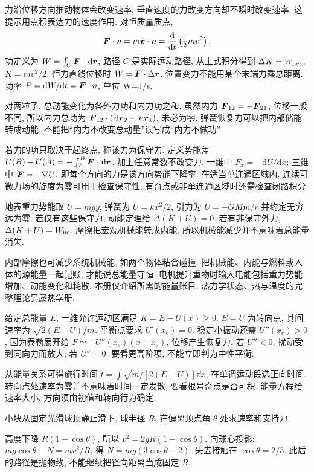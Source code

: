 \label{ch:energy}
力沿位移方向推动物体会改变速率, 垂直速度的力改变方向却不瞬时改变速率. 这提示用点积表达力的速度作用. 对恒质量质点,
\begin{equation}
\boldsymbol{F}\cdot\boldsymbol{v}=m\dot{\boldsymbol{v}}\cdot\boldsymbol{v}
=\frac{\mathrm d}{\mathrm dt}\left(\tfrac12mv^2\right).
\end{equation}
功定义为 $W=\int_C\boldsymbol{F}\cdot\,\mathrm d\boldsymbol{r}$, 路径 $C$ 是实际运动路径, 从上式积分得到 $\Delta K=W_{\rm net}$, $K=mv^2/2$. 恒力直线位移时 $W=\boldsymbol{F}\cdot\Delta\boldsymbol{r}$. 位置变力不能用某个末端力乘总距离. 功率 $P=\mathrm dW/\mathrm dt=\boldsymbol{F}\cdot\boldsymbol{v}$, 单位 W=J/s.

对两粒子, 总动能变化为各外力功和内力功之和. 虽然内力 $\boldsymbol{F}_{12}=-\boldsymbol{F}_{21}$, 位移一般不同, 所以内力总功为 $\boldsymbol{F}_{12}\cdot(\,\mathrm d\boldsymbol{r}_2-\,\mathrm d\boldsymbol{r}_1)$, 未必为零. 弹簧恢复力可以把内部储能转成动能. 不能把“内力不改变总动量”误写成“内力不做功”.

若力的功只取决于起终点, 称该力为保守力. 定义势能差 $U(B)-U(A)=-\int_A^B\boldsymbol{F}\cdot\,\mathrm d\boldsymbol{r}$. 加上任意常数不改变力. 一维中 $F_x=-\mathrm dU/\mathrm dx$; 三维中 $\boldsymbol{F}=-\nabla U$, 即每个方向的力是该方向势能下降率. 在适当单连通区域内, 连续可微力场的旋度为零可用于检查保守性; 有奇点或非单连通区域时还需检查闭路积分.

地表重力势能取 $U=mgy$, 弹簧为 $U=kx^2/2$, 引力为 $U=-GMm/r$ 并约定无穷远为零. 若仅有这些保守力, 动能定理给 $\Delta(K+U)=0$. 若有非保守外力, $\Delta(K+U)=W_{\rm nc}$. 摩擦把宏观机械能转成内能, 所以机械能减少并不意味着总能量消失.

内部摩擦也可减少系统机械能, 如两个物体粘合碰撞. 把机械能、内能与燃料或人体的源能量一起记账, 才能说总能量守恒. 电机提升重物时输入电能包括重力势能增加、动能变化和耗散. 本册仅介绍所需的能量账目, 热力学状态、热与温度的完整理论另属热学册.

给定总能量 $E$, 一维允许运动区满足 $K=E-U(x)\ge0$. $E=U$ 为转向点, 其间速率为 $\sqrt{2(E-U)/m}$. 平衡点要求 $U'(x_e)=0$. 稳定小振动还需 $U''(x_e)>0$, 因为泰勒展开给 $F\simeq-U''(x_e)(x-x_e)$, 位移产生恢复力. 若 $U''<0$, 扰动受到同向力而放大; 若 $U''=0$, 要看更高阶项, 不能立即判为中性平衡.

从能量关系可得旅行时间 $t=\int\sqrt{m/[2(E-U)]}\dd x$, 在单调运动段选正向时间. 转向点处速率为零并不意味着时间一定发散, 要看根号奇点是否可积. 能量方程给速率大小, 方向须由初值和转向行为确定.

\begin{example}
小块从固定光滑球顶静止滑下, 球半径 $R$. 在偏离顶点角 $\theta$ 处求速率和支持力.
\end{example}
\begin{solution}
高度下降 $R(1-\cos\theta)$, 所以 $v^2=2gR(1-\cos\theta)$. 向球心投影: $mg\cos\theta-N=mv^2/R$, 得 $N=mg(3\cos\theta-2)$. 失去接触在 $\cos\theta=2/3$. 此后的路径是抛物线, 不能继续把径向距离当成固定 $R$.
\end{solution}

